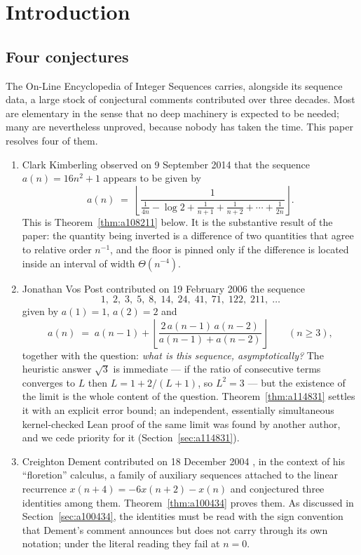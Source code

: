 \documentclass[11pt]{article}
\theoremstyle{plain}
\theoremstyle{definition}
\theoremstyle{remark}
\numberwithin{equation}{section}
\begin{document}
\section{Introduction}

\subsection{Four conjectures}

The On-Line Encyclopedia of Integer Sequences \cite{oeis} carries, alongside its sequence data,
a large stock of conjectural comments contributed over three decades. Most are elementary in
the sense that no deep machinery is expected to be needed; many are nevertheless unproved,
because nobody has taken the time. This paper resolves four of them.

\begin{enumerate}
\item[(A108211)] Clark Kimberling observed on 9 September 2014 \cite{kimberling} that the sequence
$a(n) = 16n^2+1$ appears to be given by
\[
  a(n) \;=\; \left\lfloor \frac{1}{\frac{1}{4n} - \log 2 + \frac{1}{n+1} + \frac{1}{n+2}
    + \cdots + \frac{1}{2n}} \right\rfloor .
\]
This is Theorem~\ref{thm:a108211} below. It is the substantive result of the paper: the
quantity being inverted is a difference of two quantities that agree to relative order $n^{-1}$,
and the floor is pinned only if the difference is located inside an interval of width
$\Theta(n^{-4})$.

\item[(A114831)] Jonathan Vos Post contributed on 19 February 2006 the sequence
\[
  1,\; 2,\; 3,\; 5,\; 8,\; 14,\; 24,\; 41,\; 71,\; 122,\; 211,\; \dots
\]
given by $a(1)=1$, $a(2)=2$ and
\[
  a(n) \;=\; a(n-1) + \left\lfloor \frac{2\,a(n-1)\,a(n-2)}{a(n-1)+a(n-2)} \right\rfloor
  \qquad (n \ge 3),
\]
together with the
question: \emph{what is this sequence, asymptotically?} The heuristic answer $\sqrt3$ is
immediate --- if the ratio of consecutive terms converges to $L$ then $L = 1 + 2/(L+1)$, so
$L^2 = 3$ --- but the existence of the limit is the whole content of the question.
Theorem~\ref{thm:a114831} settles it with an explicit error bound; an independent, essentially
simultaneous kernel-checked Lean proof of the same limit was found by another author, and we
cede priority for it (Section~\ref{sec:a114831}).

\item[(A100434)] Creighton Dement contributed on 18 December 2004 \cite{dement}, in the context of
his ``floretion'' calculus, a family of auxiliary sequences attached to the linear recurrence
$x(n+4) = -6x(n+2) - x(n)$ and conjectured three identities among them.
Theorem~\ref{thm:a100434} proves them. As discussed in Section~\ref{sec:a100434}, the identities
must be read with the sign convention that Dement's comment announces but does not carry through
its own notation; under the literal reading they fail at $n=0$.


\end{enumerate}
\end{document}
